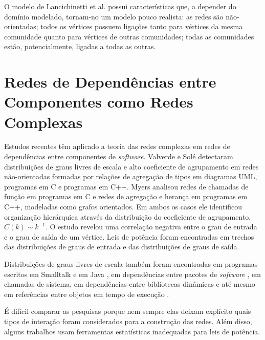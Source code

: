 \documentclass{article}
\begin{document}
O modelo de Lancichinetti et al. possui características que, a depender do domínio modelado, tornam-no um modelo pouco realista: as redes são não-orientadas; todos os vértices possuem ligações tanto para vértices da mesma comunidade quanto para vértices de outras comunidades; todas as comunidades estão, potencialmente, ligadas a todas as outras.


\section{Redes de Dependências entre Componentes como Redes Complexas}

Estudos recentes têm aplicado a teoria das redes complexas em redes de dependências entre componentes de \textit{software}. Valverde e Solé \cite{Valverde2003} detectaram distribuições de graus livres de escala e alto coeficiente de agrupamento em redes não-orientadas formadas por relações de agregação de tipos em diagramas UML, programas em C e programas em C++. Myers \cite{Myers2003} analisou redes de chamadas de função em programas em C e redes de agregação e herança em programas em C++, modeladas como grafos orientados. Em ambos os casos ele identificou organização hierárquica através da distribuição do coeficiente de agrupamento, $C(k) \sim k^{-1}$. O estudo revelou uma correlação negativa entre o grau de entrada e o grau de saída de um vértice. Leis de potência foram encontradas em trechos das distribuições de graus de entrada e das distribuições de graus de saída.

Distribuições de graus livres de escala também foram encontradas em programas escritos em Smalltalk \cite{Marchesi2004,Concas2007} e em Java \cite{Hyland-Wood2006,Baxter2006,Ichii2008}, em dependências entre pacotes de \textit{software} \cite{Labelle2004}, em chamadas de sistema, em dependências entre bibliotecas dinâmicas \cite{Louridas2008} e até mesmo em referências entre objetos em tempo de execução \cite{Potanin2005}.

É difícil comparar as pesquisas porque nem sempre elas deixam explícito quais tipos de interação foram considerados para a construção das redes. Além disso, alguns trabalhos usam ferramentas estatísticas inadequadas para leis de potência.

\end{document}
